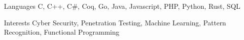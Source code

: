 
\begin{cvskills}
  \cvskill
    {Languages}
    {C, C++, C\#, Coq, Go, Java, Javascript, PHP, Python, Rust, SQL}

  \cvskill
    {Interests}
    {Cyber Security, Penetration Testing, Machine Learning, Pattern Recognition, Functional Programming}
\end{cvskills}

